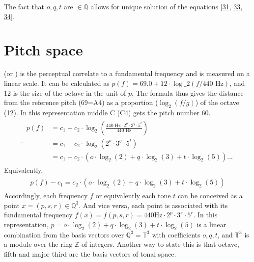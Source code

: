 \documentclass[letterpaper,10pt,english]{sphinxmanual}
\begin{document}
\sphinxAtStartPar
The fact that \(o, q, t\) are \(\in \mathbb Q\) allows for
unique solution of the equations
{[}\hyperlink{cite.8_bibliography:id50}{31}, \hyperlink{cite.8_bibliography:id49}{33}, \hyperlink{cite.8_bibliography:id4}{34}{]}.


\section{Pitch space}
\label{\detokenize{5_notes:pitch-space}}
\sphinxAtStartPar
{} (or ) is the perceptual correlate to a fundamental
frequency and is measured on a linear scale. It can be calculated as
\(p(f) = 69.0 + 12 \cdot \log\_2(f/440 \text{ Hz}) \), and 12 is the
size of the octave in the unit of \(p\). The formula thus gives the
distance from the reference pitch (69=A4) as a proportion
(\(\log_2(f/g)\)) of the octave (12). In this representation middle
C (C4) gets the pitch number 60.
\begin{equation*}
\begin{split}.. \begin{aligned}
 p(f) & = c_1+c_2\cdot \log_2\left(\frac{440 \text{ Hz}\cdot 2^o \cdot 3^q \cdot 5^t}{440\text{ Hz}}\right)\\
      & = c_1+c_2\cdot \log_2\left(2^o\cdot3^q\cdot5^t\right) \\
            & = c_1+c_2 \cdot (o\cdot\log_2(2) + q\cdot \log_2(3) + t\cdot\log_2(5) ).
.. \end{aligned}\end{split}
\end{equation*}
\sphinxAtStartPar
Equivalently,
\begin{equation*}
\begin{split}\begin{aligned}
  p(f)- c_1 = c_2 \cdot (o\cdot\log_2(2) + q\cdot \log_2(3) + t\cdot\log_2(5) )\end{aligned}\end{split}
\end{equation*}
\sphinxAtStartPar
Accordingly, each frequency \(f\) or equivalently each tone
\(t\) can be conceived as a point
\(x = (p, s, r) \in \mathbb Q^3\). And vice versa, each point is
associated with its fundamental frequency
\(f(x) = f(p, s, r) = 440 \text{Hz} \cdot 2^p \cdot 3^s \cdot 5^r\).
In this representation,
\(p = o \cdot \log_2(2) + q\cdot \log_2(3) + t\cdot \log_2(5)\) is a
linear combination from the basis vectors over
\(\mathbb Q^3 = \mathbb T^3\) with coefficients \(o, q, t\), and
\(\mathbb T^3\) is a module over the ring \(\mathbb Z\) of
integers. Another way to state this is that octave, fifth and major
third are the basis vectors of tonal space.
\end{document}
